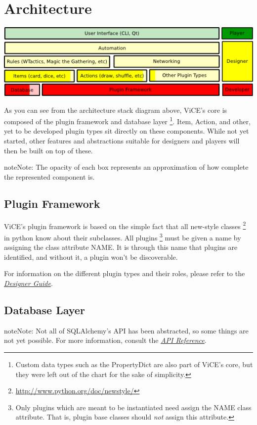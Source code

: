 \documentclass[letterpaper,10pt,english]{sphinxmanual}
\begin{document}
\section{Architecture}
\label{developer_guide/architecture::doc}\label{developer_guide/architecture:architecture}
\includegraphics{stack_diagram.png}

As you can see from the architecture stack diagram above, ViCE's core is
composed of the plugin framework and database layer \footnote{
Custom data types such as the PropertyDict are also part of ViCE's
core, but they were left out of the chart for the sake of simplicity.
}. Item, Action, and other,
yet to be developed plugin types sit directly on these components. While not
yet started, other features and abstractions suitable for designers and
players will then be built on top of these.

\begin{notice}{note}{Note:}
The opacity of each box represents an approximation of how complete the
represented component is.
\end{notice}


\subsection{Plugin Framework}
\label{developer_guide/architecture:plugin-framework}
ViCE's plugin framework is based on the simple fact that all new-style
classes \footnote{
\href{http://www.python.org/doc/newstyle/}{http://www.python.org/doc/newstyle/}
} in python know about their subclasses. All plugins \footnote{
Only plugins which are meant to be instantiated need assign the NAME
class attribute. That is, plugin base classes should \emph{not} assign
this attribute.
} must
be given a name by assigning the class attribute NAME. It is through this
name that plugins are identified, and without it, a plugin won't be
discoverable.

For information on the different plugin types and their roles, please
refer to the {\hyperref[designer_guide/designer_index::doc]{\emph{Designer Guide}}}.


\subsection{Database Layer}
\label{developer_guide/architecture:database-layer}
\begin{notice}{note}{Note:}
Not all of SQLAlchemy's API has been abstracted, so some things are
not yet possible. For more information, consult the {\hyperref[api_reference::doc]{\emph{API Reference}}}.
\end{notice}
\end{document}
